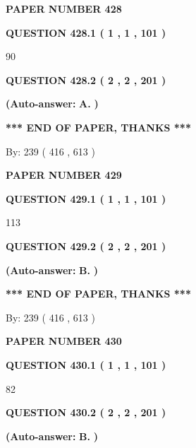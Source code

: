 \documentclass{ctexart}
\begin{document}
   
 {\textbf{ \Large{ PAPER NUMBER  428  }}}
   
   
   
   
  
  
{\textbf{\large{QUESTION
428.1 
 ( 1 , 1 , 101 )
}}}

90
  
  
{\textbf{\large{QUESTION
428.2 
 ( 2 , 2 , 201 )
}}}
 
 
{\textbf{(Auto-answer:}}
{\textbf{\large{
A.}}}
{\textbf{)}}
 
 
   
   
   
   
\vspace{1.0in} 
{\textbf{\large{ *** END OF PAPER, THANKS *** }}} 
   
   
\hspace{1.0in} By: 
 239 ( 416 ,  613 )
   
   
   
   
\newpage 
\setcounter{page}{ 
   429001 } 
   
   
 {\textbf{ \Large{ PAPER NUMBER  429  }}}
   
   
   
   
  
  
{\textbf{\large{QUESTION
429.1 
 ( 1 , 1 , 101 )
}}}

113
  
  
{\textbf{\large{QUESTION
429.2 
 ( 2 , 2 , 201 )
}}}
 
 
{\textbf{(Auto-answer:}}
{\textbf{\large{
B.}}}
{\textbf{)}}
 
 
   
   
   
   
\vspace{1.0in} 
{\textbf{\large{ *** END OF PAPER, THANKS *** }}} 
   
   
\hspace{1.0in} By: 
 239 ( 416 ,  613 )
   
   
   
   
\newpage 
\setcounter{page}{ 
   430001 } 
   
   
 {\textbf{ \Large{ PAPER NUMBER  430  }}}
   
   
   
   
  
  
{\textbf{\large{QUESTION
430.1 
 ( 1 , 1 , 101 )
}}}

82
  
  
{\textbf{\large{QUESTION
430.2 
 ( 2 , 2 , 201 )
}}}
 
 
{\textbf{(Auto-answer:}}
{\textbf{\large{
B.}}}
{\textbf{)}}
 
\end{document}
